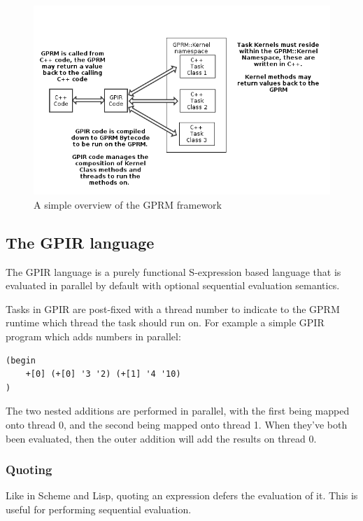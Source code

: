 \begin{figure}[ht]
\begin{center}
\includegraphics{graphs/gprm.png}
\caption{A simple overview of the GPRM framework}
\end{center}
\end{figure}

\subsection{The GPIR language}

The GPIR language is a purely functional S-expression based language that is evaluated in parallel by default 
with optional sequential evaluation semantics.

Tasks in GPIR are post-fixed with a thread number to indicate to the GPRM runtime which thread
the task should run on. For example a simple GPIR program which adds numbers in parallel:

\begin{lstlisting}[style=myGPIR]
(begin
    +[0] (+[0] '3 '2) (+[1] '4 '10)
)
\end{lstlisting}

The two nested additions are performed in parallel, with the first being mapped onto thread 0,
and the second being mapped onto thread 1. When they've both been evaluated, then the outer addition
will add the results on thread 0.

\subsubsection{Quoting}

Like in Scheme and Lisp, quoting an expression defers the evaluation of it. 
This is useful for performing sequential evaluation.

